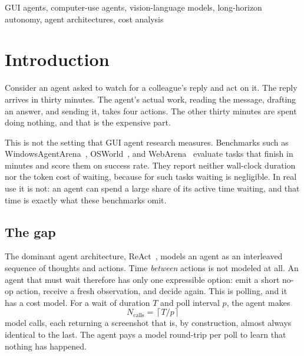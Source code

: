 \documentclass[conference]{IEEEtran}
\begin{document}
\begin{IEEEkeywords}
GUI agents, computer-use agents, vision-language models, long-horizon autonomy,
agent architectures, cost analysis
\end{IEEEkeywords}

\section{Introduction}
\label{sec:intro}

Consider an agent asked to watch for a colleague's reply and act on it. The
reply arrives in thirty minutes. The agent's actual work, reading the message,
drafting an answer, and sending it, takes four actions. The other thirty minutes
are spent doing nothing, and that is the expensive part.

This is not the setting that GUI agent research measures. Benchmarks such as
WindowsAgentArena~\cite{waa}, OSWorld~\cite{osworld}, and WebArena~\cite{webarena}
evaluate tasks that finish in minutes and score them on success rate. They report
neither wall-clock duration nor the token cost of waiting, because for such tasks
waiting is negligible. In real use it is not: an agent can spend a large share of
its active time waiting, and that time is exactly what these benchmarks omit.

\subsection{The gap}
The dominant agent architecture, ReAct~\cite{react}, models an agent as an
interleaved sequence of thoughts and actions. Time \emph{between} actions is not
modeled at all. An agent that must wait therefore has only one expressible
option: emit a short no-op action, receive a fresh observation, and decide again.
This is polling, and it has a cost model. For a wait of duration $T$ and poll
interval $p$, the agent makes
\begin{equation}
N_{\text{calls}} = \left\lceil T/p \right\rceil
\label{eq:poll}
\end{equation}
model calls, each returning a screenshot that is, by construction, almost always
identical to the last. The agent pays a model round-trip per poll to learn that
nothing has happened.
\end{document}
